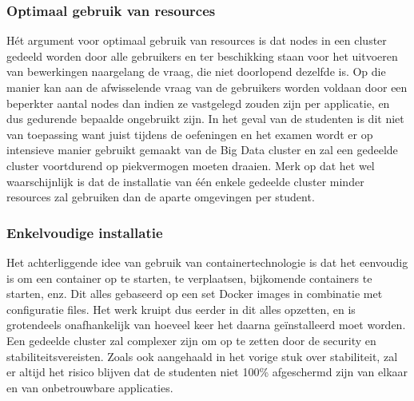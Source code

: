 \subsubsection{Optimaal gebruik van resources}
Hét argument voor optimaal gebruik van resources is dat nodes in een cluster gedeeld worden door alle gebruikers en ter beschikking staan voor het uitvoeren van bewerkingen naargelang de vraag, die niet doorlopend dezelfde is. Op die manier kan aan de afwisselende vraag van de gebruikers worden voldaan door een beperkter aantal nodes dan indien ze vastgelegd zouden zijn per applicatie, en dus gedurende bepaalde ongebruikt zijn.
\newline
In het geval van de studenten is dit niet van toepassing want juist tijdens de oefeningen en het examen wordt er op intensieve manier gebruikt gemaakt van de Big Data cluster en zal een gedeelde cluster voortdurend op piekvermogen moeten draaien.
\newline
Merk op dat het wel waarschijnlijk is dat de installatie van één enkele gedeelde cluster minder resources zal gebruiken dan de aparte omgevingen per student.

\subsubsection{Enkelvoudige installatie}
Het achterliggende idee van gebruik van containertechnologie is dat het eenvoudig is om een container op te starten, te verplaatsen, bijkomende containers te starten, enz. Dit alles gebaseerd op een set Docker images in combinatie met configuratie files.
\newline
Het werk kruipt dus eerder in dit alles opzetten, en is grotendeels onafhankelijk van hoeveel keer het daarna geïnstalleerd moet worden.
Een gedeelde cluster zal complexer zijn om op te zetten door de security en stabiliteitsvereisten.
\newline
Zoals ook aangehaald in het vorige stuk over stabiliteit, zal er altijd het risico blijven dat de studenten niet 100\% afgeschermd zijn van elkaar en van onbetrouwbare applicaties.

